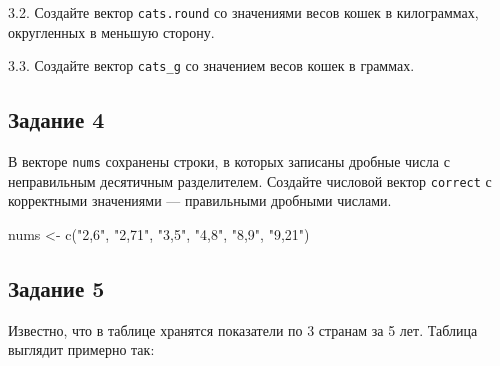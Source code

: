 \documentclass[
]{article}
\newenvironment{Shaded}{\begin{snugshade}}{\end{snugshade}}
\newcommand{\FunctionTok}[1]{\textcolor[rgb]{0.00,0.00,0.00}{#1}}
\newcommand{\NormalTok}[1]{#1}
\newcommand{\OtherTok}[1]{\textcolor[rgb]{0.56,0.35,0.01}{#1}}
\newcommand{\StringTok}[1]{\textcolor[rgb]{0.31,0.60,0.02}{#1}}
\begin{document}
3.2. Создайте вектор \texttt{cats.round} со значениями весов кошек в
килограммах, округленных в меньшую сторону.

3.3. Создайте вектор \texttt{cats\_g} со значением весов кошек в
граммах.

\hypertarget{ux437ux430ux434ux430ux43dux438ux435-4}{%
\subsection{Задание 4}\label{ux437ux430ux434ux430ux43dux438ux435-4}}

В векторе \texttt{nums} сохранены строки, в которых записаны дробные
числа с неправильным десятичным разделителем. Создайте числовой вектор
\texttt{correct} с корректными значениями --- правильными дробными
числами.

\begin{Shaded}
\begin{Highlighting}[]
\NormalTok{nums }\OtherTok{\textless{}{-}} \FunctionTok{c}\NormalTok{(}\StringTok{"2,6"}\NormalTok{, }\StringTok{"2,71"}\NormalTok{, }\StringTok{"3,5"}\NormalTok{, }\StringTok{"4,8"}\NormalTok{, }\StringTok{"8,9"}\NormalTok{, }\StringTok{"9,21"}\NormalTok{)}
\end{Highlighting}
\end{Shaded}

\hypertarget{ux437ux430ux434ux430ux43dux438ux435-5}{%
\subsection{Задание 5}\label{ux437ux430ux434ux430ux43dux438ux435-5}}

Известно, что в таблице хранятся показатели по 3 странам за 5 лет.
Таблица выглядит примерно так:
\end{document}
